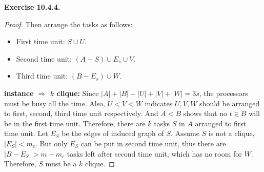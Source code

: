 \documentclass[a4paper]{article}
\newtheorem*{proof}{Proof}
\newenvironment{exercise}[1]{
	\par
	\noindent\textbf{Exercise #1.}\quad
}{
	\par
	\bigskip
}
\begin{document}
\begin{exercise}{10.4.4}
\begin{proof}
Then arrange the tasks as follows:
\begin{itemize}
    \item First time unit: $S\cup U$.
    \item Second time unit: $(A-S)\cup E_s\cup V$.
    \item Third time unit: $(B-E_s)\cup W$.
\end{itemize}\par
{\bf instance $\Rightarrow$ $k$ clique:} Since $|A|+|B|+|U|+|V|+|W|=3s$, the processors must be busy all the time.
Also, $U<V<W$ indicates $U,V,W$ should be arranged to first, second, third time unit respectively.
And $A<B$ shows that no $t\in B$ will be in the first time unit. Therefore, there are $k$ tasks $S$ in $A$ arranged
to first time unit. Let $E_S$ be the edges of induced graph of $S$. Assume $S$ is not a clique, $|E_S|<m_c$.
But only $E_S$ can be put in second time unit, thus there are $|B-E_S|>m-m_c$ tasks left after second time unit,
which has no room for $W$. Therefore, $S$ must be a $k$ clique.
\end{proof}
\end{exercise}
\end{document}
